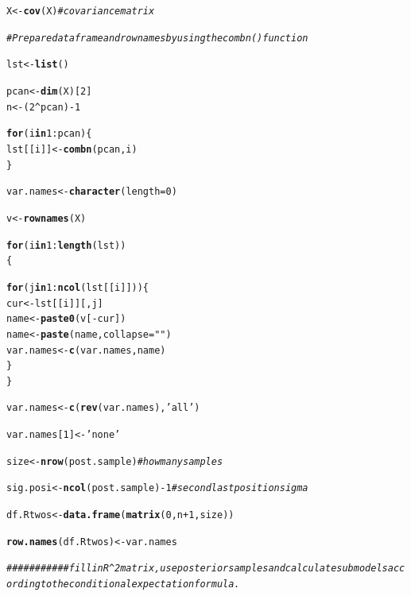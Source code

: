 \documentclass[11pt,a4paper,twoside]{book}\usepackage[]{graphicx}\usepackage[]{color}
\makeatletter
\newcommand{\hlnum}[1]{\textcolor[rgb]{0.686,0.059,0.569}{#1}}%
\newcommand{\hlstr}[1]{\textcolor[rgb]{0.192,0.494,0.8}{#1}}%
\newcommand{\hlcom}[1]{\textcolor[rgb]{0.678,0.584,0.686}{\textit{#1}}}%
\newcommand{\hlopt}[1]{\textcolor[rgb]{0,0,0}{#1}}%
\newcommand{\hlstd}[1]{\textcolor[rgb]{0.345,0.345,0.345}{#1}}%
\newcommand{\hlkwa}[1]{\textcolor[rgb]{0.161,0.373,0.58}{\textbf{#1}}}%
\newcommand{\hlkwb}[1]{\textcolor[rgb]{0.69,0.353,0.396}{#1}}%
\newcommand{\hlkwc}[1]{\textcolor[rgb]{0.333,0.667,0.333}{#1}}%
\newcommand{\hlkwd}[1]{\textcolor[rgb]{0.737,0.353,0.396}{\textbf{#1}}}%
\newenvironment{kframe}{%
 \def\at@end@of@kframe{}%
 \ifinner\ifhmode%
  \def\at@end@of@kframe{\end{minipage}}%
  \begin{minipage}{\columnwidth}%
 \fi\fi%
 \def\FrameCommand##1{\hskip\@totalleftmargin \hskip-\fboxsep
 \colorbox{shadecolor}{##1}\hskip-\fboxsep
     \hskip-\linewidth \hskip-\@totalleftmargin \hskip\columnwidth}%
 \MakeFramed {\advance\hsize-\width
   \@totalleftmargin\z@ \linewidth\hsize
   \@setminipage}}%
 {\par\unskip\endMakeFramed%
 \at@end@of@kframe}
\newenvironment{knitrout}{}{} %
\makeatother
\begin{document}
\begin{knitrout}
\begin{kframe}
\begin{alltt}
        \hlstd{X} \hlkwb{<-} \hlkwd{cov}\hlstd{(X)} \hlcom{#covariance matrix}

        \hlcom{#Prepare data frame and rownames by using the combn() function}

        \hlstd{lst} \hlkwb{<-} \hlkwd{list}\hlstd{()}

        \hlstd{pcan} \hlkwb{<-} \hlkwd{dim}\hlstd{(X)[}\hlnum{2}\hlstd{]}
        \hlstd{n} \hlkwb{<-} \hlstd{(}\hlnum{2}\hlopt{^}\hlstd{pcan)}\hlopt{-}\hlnum{1}

        \hlkwa{for} \hlstd{(i} \hlkwa{in} \hlnum{1}\hlopt{:}\hlstd{pcan)\{}
                \hlstd{lst[[i]]} \hlkwb{<-} \hlkwd{combn}\hlstd{(pcan,i)}
        \hlstd{\}}

        \hlstd{var.names} \hlkwb{<-} \hlkwd{character}\hlstd{(}\hlkwc{length} \hlstd{=} \hlnum{0}\hlstd{)}

  \hlstd{v}\hlkwb{<-} \hlkwd{rownames}\hlstd{(X)}

        \hlkwa{for}\hlstd{(i} \hlkwa{in} \hlnum{1}\hlopt{:}\hlkwd{length}\hlstd{(lst))}
        \hlstd{\{}

                \hlkwa{for} \hlstd{(j} \hlkwa{in} \hlnum{1}\hlopt{:}\hlkwd{ncol}\hlstd{(lst[[i]]))\{}
                        \hlstd{cur}\hlkwb{<-} \hlstd{lst[[i]][,j]}
                        \hlstd{name} \hlkwb{<-} \hlkwd{paste0}\hlstd{(v[}\hlopt{-}\hlstd{cur])}
                        \hlstd{name} \hlkwb{<-} \hlkwd{paste}\hlstd{(name,} \hlkwc{collapse} \hlstd{=} \hlstr{" "}\hlstd{)}
                        \hlstd{var.names} \hlkwb{<-} \hlkwd{c}\hlstd{(var.names, name)}
                \hlstd{\}}
        \hlstd{\}}

        \hlstd{var.names}\hlkwb{<-}\hlkwd{c}\hlstd{(}\hlkwd{rev}\hlstd{(var.names),} \hlstr{'all'}\hlstd{)}

        \hlstd{var.names[}\hlnum{1}\hlstd{]}\hlkwb{<-}\hlstr{'none'}

        \hlstd{size} \hlkwb{<-} \hlkwd{nrow}\hlstd{(post.sample)}  \hlcom{# how many samples}

        \hlstd{sig.posi} \hlkwb{<-} \hlkwd{ncol}\hlstd{(post.sample)}\hlopt{-}\hlnum{1} \hlcom{# second last position sigma}

        \hlstd{df.Rtwos}\hlkwb{<-}\hlkwd{data.frame}\hlstd{(}\hlkwd{matrix}\hlstd{(}\hlnum{0}\hlstd{,n}\hlopt{+}\hlnum{1}\hlstd{,size))}

        \hlkwd{row.names}\hlstd{(df.Rtwos)} \hlkwb{<-} \hlstd{var.names}



        \hlcom{########### fill in R^2 matrix, use posterior samples and calculate submodels according to the conditional expectation formula.}


\end{alltt}
\end{kframe}
\end{knitrout}
\end{document}
